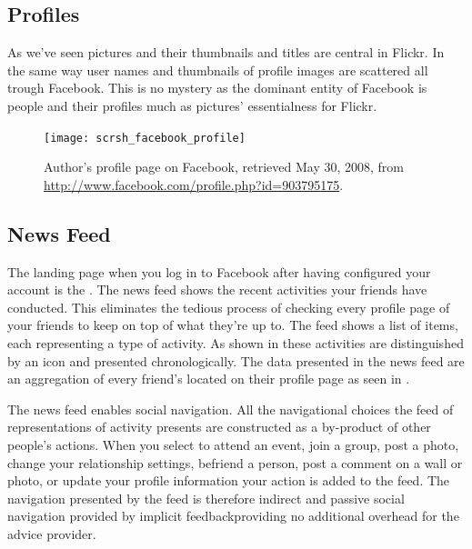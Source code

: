 \subsection{Profiles}

As we've seen pictures and their thumbnails and titles are central in Flickr.
In the same way user names and thumbnails of profile images are scattered all
trough Facebook. This is no mystery as the dominant entity of Facebook is
people and their profiles much as pictures' essentialness for Flickr.

\begin{figure}
  \begin{whole}
    \texttt{[image: scrsh\_facebook\_profile]}
    \caption[Facebook Profile]{%
       Author's profile page on Facebook,
       retrieved May 30, 2008, from
       \url{http://www.facebook.com/profile.php?id=903795175}.}
    \label{figure:scrsh.facebook.profile}
  \end{whole}
\end{figure}

\subsection{News Feed}
\label{section:analysis.facebook.news.feed}

The landing page when you log in to Facebook after having configured your
account is the  .
The news feed shows the recent activities your
friends have conducted. This eliminates the tedious process of checking every
profile page of your friends to keep on top of what they're up to.
The feed shows a list of items, each representing a type of activity. As
shown in 
these activities are distinguished by an
icon and presented chronologically. The data presented in the news feed are an
aggregation of every friend's  located on their profile page
 as seen in .

The news feed enables social navigation. All the navigational choices the feed
of representations of activity presents are constructed as a by-product of
other people's actions. When you select to attend an event, join a group,
post a photo, change your relationship settings, befriend a person, post a
comment on a wall or photo, or update your profile information your action
is added to the feed. The navigation presented by the feed
is therefore indirect and passive social navigation provided by implicit
feedback\dash{}providing no additional overhead for the advice provider.

